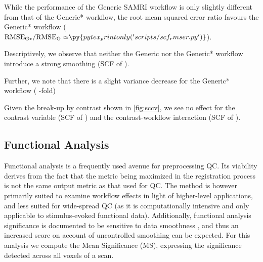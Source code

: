 While the performance of the Generic SAMRI workflow is only slightly different from that of the Generic* workflow, the root mean squared error ratio favours the Generic* workflow ($\mathrm{RMSE_{G*}/RMSE_{G}\simeq} \py{pytex_printonly('scripts/scf_rmser.py')}$).

Descriptively, we observe that neither the Generic nor the Generic* workflow introduce a strong smoothing (SCF of ).

Further, we note that there is a slight variance decrease for the Generic* workflow
(
-fold)

Given the break-up by contrast shown in \cref{fig:sccv}, we see no effect for the contrast variable
(SCF of )
and the contrast-workflow interaction
(SCF of ).

\subsection{Functional Analysis}

Functional analysis is a frequently used avenue for preprocessing QC.
Its viability derives from the fact that the metric being maximized in the registration process is not the same output metric as that used for QC.
The method is however primarily suited to examine workflow effects in light of higher-level applications, and less suited for wide-spread QC (as it is computationally intensive and only applicable to stimulus-evoked functional data).
Additionally, functional analysis significance is documented to be sensitive to data smoothness \cite{Molloy2014}, and thus an increased score on account of uncontrolled smoothing can be expected.
For this analysis we compute the Mean Significance (MS), expressing the significance detected across all voxels of a scan.

